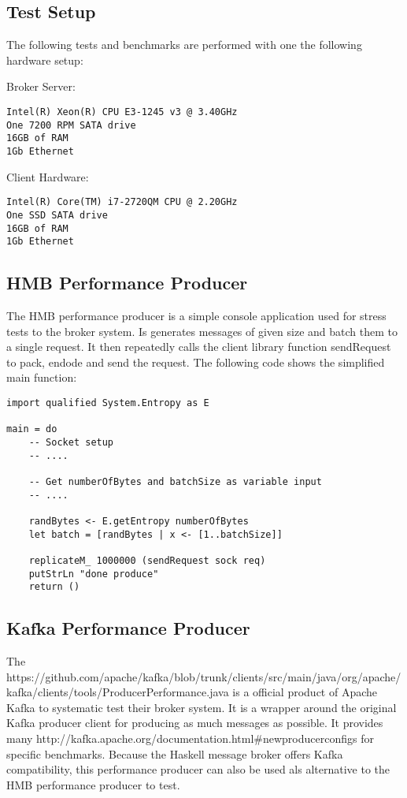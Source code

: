 \subsection{Test Setup}
The following tests and benchmarks are performed with one the following
hardware setup:

Broker Server:
\begin{verbatim}
Intel(R) Xeon(R) CPU E3-1245 v3 @ 3.40GHz
One 7200 RPM SATA drive
16GB of RAM
1Gb Ethernet 
\end{verbatim}

Client Hardware:
\begin{verbatim}
Intel(R) Core(TM) i7-2720QM CPU @ 2.20GHz
One SSD SATA drive
16GB of RAM 
1Gb Ethernet
\end{verbatim}

\subsection{HMB Performance Producer}
\label{conc-eval-hmbperformanceprod}
The HMB performance producer is a simple console application used for stress
tests to the broker system. Is generates messages of given size and batch them
to a single request. It then repeatedly calls the client library function
sendRequest to pack, endode and send the request. The following code shows the
simplified main function: 

\begin{lstlisting}
import qualified System.Entropy as E

main = do 
    -- Socket setup 
    -- ....

    -- Get numberOfBytes and batchSize as variable input 
    -- ....

    randBytes <- E.getEntropy numberOfBytes 
    let batch = [randBytes | x <- [1..batchSize]]

    replicateM_ 1000000 (sendRequest sock req) 
    putStrLn "done produce"
    return ()

\end{lstlisting}

\subsection{Kafka Performance Producer}
\label{conc-eval-kafkaperformanceprod}
The 
{https://github.com/apache/kafka/blob/trunk/clients/src/main/java/org/apache/kafka/clients/tools/ProducerPerformance.java}
is a official product of Apache Kafka to systematic test their broker
system. It is a wrapper around the original Kafka producer client for producing
as much messages as possible. It provides many 
{http://kafka.apache.org/documentation.html\#newproducerconfigs} for specific
benchmarks. Because the Haskell message broker offers Kafka compatibility,  this
performance producer can also be used als alternative to the HMB performance
producer to test. 

